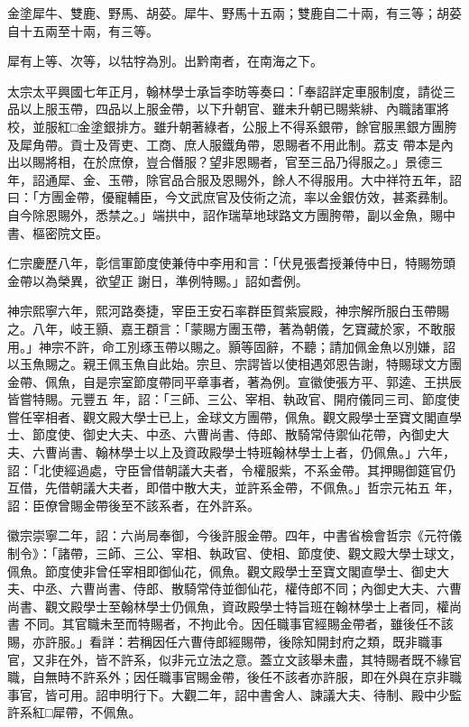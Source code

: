 \begin{pinyinscope}
 金塗犀牛、雙鹿、野馬、胡荽。犀牛、野馬十五兩；雙鹿自二十兩，有三等；胡荽自十五兩至十兩，有三等。



 犀有上等、次等，以牯牸為別。出黔南者，在南海之下。



 太宗太平興國七年正月，翰林學士承旨李昉等奏曰：「奉詔詳定車服制度，請從三品以上服玉帶，四品以上服金帶，以下升朝官、雖未升朝已賜紫緋、內職諸軍將校，並服紅□金塗銀排方。雖升朝著綠者，公服上不得系銀帶，餘官服黑銀方團胯及犀角帶。貢士及胥吏、工商、庶人服鐵角帶，恩賜者不用此制。荔支
 帶本是內出以賜將相，在於庶僚，豈合僭服？望非恩賜者，官至三品乃得服之。」景德三年，詔通犀、金、玉帶，除官品合服及恩賜外，餘人不得服用。大中祥符五年，詔曰：「方團金帶，優寵輔臣，今文武庶官及伎術之流，率以金銀仿效，甚紊彞制。自今除恩賜外，悉禁之。」端拱中，詔作瑞草地球路文方團胯帶，副以金魚，賜中書、樞密院文臣。



 仁宗慶歷八年，彰信軍節度使兼侍中李用和言：「伏見張耆授兼侍中日，特賜笏頭金帶以為榮異，欲望正
 謝日，準例特賜。」詔如耆例。



 神宗熙寧六年，熙河路奏捷，宰臣王安石率群臣賀紫宸殿，神宗解所服白玉帶賜之。八年，岐王顥、嘉王頵言：「蒙賜方團玉帶，著為朝儀，乞寶藏於家，不敢服用。」神宗不許，命工別琢玉帶以賜之。顥等固辭，不聽；請加佩金魚以別嫌，詔以玉魚賜之。親王佩玉魚自此始。宗旦、宗諤皆以使相遇郊恩告謝，特賜球文方團金帶、佩魚，自是宗室節度帶同平章事者，著為例。宣徽使張方平、郭逵、王拱辰皆嘗特賜。元豐五
 年，詔：「三師、三公、宰相、執政官、開府儀同三司、節度使嘗任宰相者、觀文殿大學士已上，金球文方團帶，佩魚。觀文殿學士至寶文閣直學士、節度使、御史大夫、中丞、六曹尚書、侍郎、散騎常侍禦仙花帶，內御史大夫、六曹尚書、翰林學士以上及資政殿學士特班翰林學士上者，仍佩魚。」六年，詔：「北使經過處，守臣曾借朝議大夫者，令權服紫，不系金帶。其押賜御筵官仍互借，先借朝議大夫者，即借中散大夫，並許系金帶，不佩魚。」哲宗元祐五
 年，詔：臣僚曾賜金帶後至不該系者，在外許系。



 徽宗崇寧二年，詔：六尚局奉御，今後許服金帶。四年，中書省檢會哲宗《元符儀制令》：「諸帶，三師、三公、宰相、執政官、使相、節度使、觀文殿大學士球文，佩魚。節度使非曾任宰相即御仙花，佩魚。觀文殿學士至寶文閣直學士、御史大夫、中丞、六曹尚書、侍郎、散騎常侍並御仙花，權侍郎不同；內御史大夫、六曹尚書、觀文殿學士至翰林學士仍佩魚，資政殿學士特旨班在翰林學士上者同，權尚書
 不同。其官職未至而特賜者，不拘此令。因任職事官經賜金帶者，雖後任不該賜，亦許服。」看詳：若稱因任六曹侍郎經賜帶，後除知開封府之類，既非職事官，又非在外，皆不許系，似非元立法之意。蓋立文該舉未盡，其特賜者既不緣官職，自無時不許系外；因任職事官賜金帶，後任不該者亦許服，即在外與在京非職事官，皆可用。詔申明行下。大觀二年，詔中書舍人、諫議大夫、待制、殿中少監許系紅□犀帶，不佩魚。




\end{pinyinscope}
